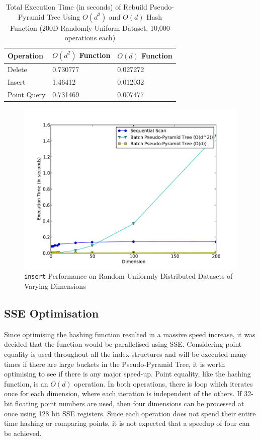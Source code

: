 \begin{table}
	\centering
	\begin{tabular}{|l|l|l|}
		\hline
		\textbf{Operation} & \textbf{$O(d^2)$ Function} & \textbf{$O(d)$ Function} \\
		\hline
		Delete & 0.730777 & 0.027272  \\
		Insert & 1.46412 & 0.012032 \\
		Point Query & 0.731469 & 0.007477 \\
		\hline
	\end{tabular}
	\caption{Total Execution Time (in seconds) of Rebuild Pseudo-Pyramid Tree Using $O(d^2)$ and $O(d)$ Hash Function (200D Randomly Uniform Dataset, 10,000 operations each)}
	\label{tab:new-pseudo-pyramid-hash}
\end{table}

\begin{figure}
	\centering
	\includegraphics[scale=0.5]{figures/performance_analysis/iteration_1/new_pseudo-pyramid_hash_performance.pdf}
	\caption{\texttt{insert} Performance on Random Uniformly Distributed Datasets of Varying Dimensions}
	\label{fig:new-pseudo-pyramid-hash}
\end{figure}

\subsection{SSE Optimisation}

Since optimising the hashing function resulted in a massive speed increase, it was decided that the function would be parallelised using SSE. Considering point equality is used throughout all the index structures and will be executed many times if there are large buckets in the Pseudo-Pyramid Tree, it is worth optimising to see if there is any major speed-up. Point equality, like the hashing function, is an $O(d)$ operation. In both operations, there is loop which iterates once for each dimension, where each iteration is independent of the others. If 32-bit floating point numbers are used, then four dimensions can be processed at once using 128 bit SSE registers. Since each operation does not spend their entire time hashing or comparing points, it is not expected that a speedup of four can be achieved.

